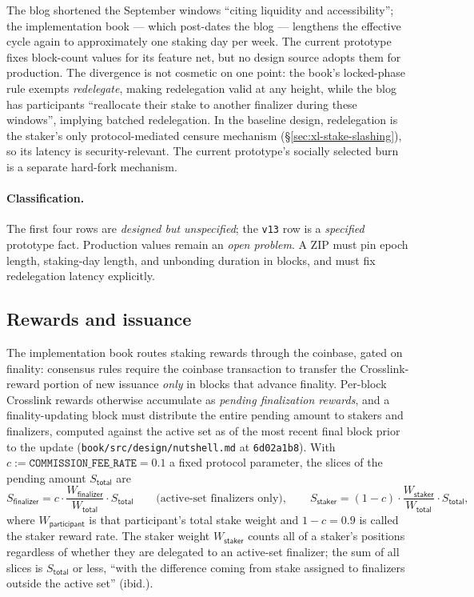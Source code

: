 \documentclass[11pt,a4paper]{article}
\theoremstyle{definition}
\begin{document}
The blog shortened the September windows ``citing liquidity and
accessibility''; the implementation book --- which post-dates the blog ---
lengthens the effective cycle again to approximately one staking day per
week. The current prototype fixes block-count values for its feature net,
but no design source adopts them for production. The divergence is not
cosmetic on one point: the book's locked-phase rule exempts
\emph{redelegate}, making redelegation valid at any height, while the
blog has participants ``reallocate their stake to another finalizer
during these windows'', implying batched redelegation. In the baseline
design, redelegation is the staker's only protocol-mediated censure
mechanism (\S\ref{sec:xl-stake-slashing}), so its latency is
security-relevant. The current prototype's socially selected burn is a
separate hard-fork mechanism.

\paragraph{Classification.} The first four rows are \emph{designed but
unspecified}; the \texttt{v13} row is a \emph{specified} prototype fact.
Production values remain an \emph{open problem}. A ZIP must pin epoch
length, staking-day length, and unbonding duration in blocks, and must fix
redelegation latency explicitly.

\subsection{Rewards and issuance}\label{sec:xl-stake-rewards}

The implementation book routes staking rewards through the coinbase, gated
on finality: consensus rules require the coinbase transaction to transfer
the Crosslink-reward portion of new issuance \emph{only} in blocks that
advance finality. Per-block Crosslink rewards otherwise accumulate as
\emph{pending finalization rewards}, and a finality-updating block must
distribute the entire pending amount to stakers and finalizers, computed
against the active set as of the most recent final block prior to the
update (\texttt{book/src/design/nutshell.md} at \texttt{6d02a1b8}). With
$c := \texttt{COMMISSION\_FEE\_RATE} = 0.1$ a fixed protocol parameter,
the slices of the pending amount $S_{\mathsf{total}}$ are
%
\begin{equation}\label{eq:xl-reward-slices}
S_{\mathsf{finalizer}}
  = c \cdot \frac{W_{\mathsf{finalizer}}}{W_{\mathsf{total}}}
    \cdot S_{\mathsf{total}}
\qquad\text{(active-set finalizers only)},
\qquad
S_{\mathsf{staker}}
  = (1 - c) \cdot \frac{W_{\mathsf{staker}}}{W_{\mathsf{total}}}
    \cdot S_{\mathsf{total}},
\end{equation}
%
where $W_{\mathsf{participant}}$ is that participant's total stake weight
and $1 - c = 0.9$ is called the staker reward rate. The staker weight
$W_{\mathsf{staker}}$ counts all of a staker's positions regardless of
whether they are delegated to an active-set finalizer; the sum of all
slices is $S_{\mathsf{total}}$ or less, ``with the difference coming from
stake assigned to finalizers outside the active set'' (ibid.).
\end{document}

